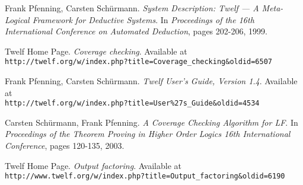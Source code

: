 \documentclass[12pt]{article}
\begin{document}
\begin{thebibliography}{9}

Frank Pfenning, Carsten Sch\"{u}rmann.
\textit{System Description: Twelf --- A Meta-Logical Framework for Deductive Systems}.
In \textit{Proceedings of the 16th International Conference on Automated Deduction}, pages 202-206, 1999.

Twelf Home Page.
\textit{Coverage checking}.
Available at \\
\verb|http://twelf.org/w/index.php?title=Coverage_checking&oldid=6507|

Frank Pfenning, Carsten Sch\"{u}rmann.
\textit{Twelf User's Guide, Version 1.4}.
Available at \\
\verb|http://twelf.org/w/index.php?title=User%27s_Guide&oldid=4534|

Carsten Sch\"{u}rmann, Frank Pfenning.
\textit{A Coverage Checking Algorithm for LF}.
In \textit{Proceedings of the Theorem Proving in Higher Order Logics 16th International Conference}, pages 120-135, 2003.

Twelf Home Page.
\textit{Output factoring}.
Available at \\
\verb|http://www.twelf.org/w/index.php?title=Output_factoring&oldid=6190|

\end{thebibliography}
\end{document}
